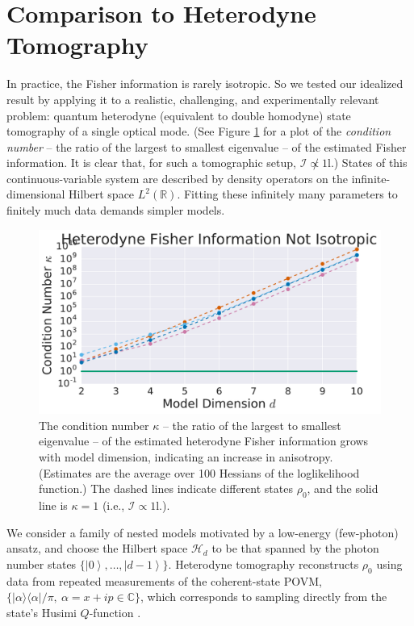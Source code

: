 \documentclass[aps,pra, twocolumn]{revtex4-1}
\newcommand{\reals}{\mathbb{R}}
\newcommand{\Id}{\mathbb{I}}
\newcommand{\ket}[1]{\ensuremath{\left|#1\right\rangle}}
\def\Id{1\!\mathrm{l}}
\begin{document}
\section{Comparison to Heterodyne Tomography}
\label{sec:heterotomo}
In practice, the Fisher information is rarely isotropic.  So we tested our idealized result by applying it to a realistic, challenging, and experimentally relevant problem: quantum heterodyne (equivalent to double homodyne) state tomography \cite{Lvovsky2001a, Bertrand1987, Leonhardt1995, Lvovsky2009} of a single optical mode.  (See Figure \ref{fig:fish_condition} for a plot of the \emph{condition number} -- the ratio of the largest to smallest eigenvalue -- of the estimated Fisher information. It is clear that, for such a tomographic setup, $\mathcal{I} \not \propto \Id$.) States of this continuous-variable system are described by density operators on the infinite-dimensional Hilbert space $L^2(\reals)$.  Fitting these infinitely many parameters to finitely much data demands simpler models.

\begin{figure}[h]
  \includegraphics[width=\columnwidth]{Images/Figure_7.pdf}
 \caption{The condition number $\kappa$ -- the ratio of the largest to smallest eigenvalue -- of the estimated heterodyne Fisher information grows with model dimension, indicating an increase in anisotropy. (Estimates are the average over 100 Hessians of the loglikelihood function.) The dashed lines indicate different states $\rho_{0}$, and the solid line is $\kappa = 1$ (i.e., $\mathcal{I} \propto \Id$.).}
\label{fig:fish_condition}
\end{figure}

We consider a family of nested models motivated by a low-energy (few-photon) ansatz, and choose   
the Hilbert space $\mathcal{H}_d$ to be that spanned by the photon number states $\{\ket{0},\ldots ,\ket{d-1}\}$.
Heterodyne tomography reconstructs $\rho_{0}$ using data from repeated measurements of the 
coherent-state POVM, $\{|\alpha\rangle\langle \alpha| /\pi, ~\alpha=x+ip\in \mathbb{C}\}$, which corresponds to sampling directly from the 
state's Husimi $Q$-function \cite{Husimi1940}.
\end{document}
